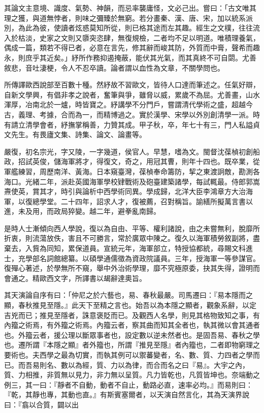 \begin{pinyinscope}
其論文主意境、識度、氣勢、神韻，而忌率襲庸怪，文必己出。嘗曰：「古文唯其理之獲，與道無悖者，則味之彌臻於無窮。若分畫秦、漢、唐、宋，加以統系派別，為此為彼，使讀者炫惑莫知所從，則已格其途而左其趣。經生之文樸，往往流入於枯淡，史家之文則又隳突恣肆，無復規檢，二者均不足以明道。唯積理養氣，偶成一篇，類若不得已者，必意在言先，修其辭而峻其防，外質而中膏，聲希而趣永，則庶乎其近矣。」紓所作務抑遏掩蔽，能伏其光氣，而其真終不可自閟。尤善敘悲，音吐淒梗，令人不忍卒讀。論者謂以血性為文章，不關學問也。

所傳譯歐西說部至百數十種。然紓故不習歐文，皆待人口達而筆述之。任氣好辯，自新文學興，有倡非孝之說者，奮筆與爭，雖脅以威，累歲不為屈。尤善畫，山水渾厚，冶南北於一爐，時皆寶之。紓講學不分門戶，嘗謂清代學術之盛，超越今古，義理、考據，合而為一，而精博過之。實於漢學、宋學以外別創清學一派。時有請立清學會者，紓撫掌稱善，力贊其成。甲子秋，卒，年七十有三，門人私謚貞文先生。有畏廬文集、詩集、論文、論畫等。

嚴復，初名宗光，字又陵，一字幾道，侯官人。早慧，嗜為文。閩督沈葆楨初創船政，招試英俊，儲海軍將才，得復文，奇之，用冠其曹，則年十四也。既卒業，從軍艦練習，周歷南洋、黃海。日本窺臺灣，葆楨奉命籌防，挈之東渡詗敵，勘測各海口。光緒二年，派赴英國海軍學校肄戰術及砲臺建築諸學，每試輒最。侍郎郭嵩燾使英，賞其才，時引與論析中西學術同異。學成歸，北洋大臣李鴻章方大治海軍，以復總學堂。二十四年，詔求人才，復被薦，召對稱旨。諭繕所擬萬言書以進，未及用，而政局猝變。越二年，避拳亂南歸。

是時人士漸傾向西人學說，復以為自由、平等、權利諸說，由之未嘗無利，脫靡所折衷，則流蕩放佚，害且不可勝言，常於廣眾中陳之。復久以海軍積勞敘副將，盡棄去，入貲為同知，累保道員。宣統元年，海軍部立，特授協都統，尋賜文科進士，充學部名詞館總纂。以碩學通儒徵為資政院議員。三年，授海軍一等參謀官。復殫心著述，於學無所不窺，舉中外治術學理，靡不究極原委，抉其失得，證明而會通之。精歐西文字，所譯書以朅辭達奧旨。

其天演論自序有曰：「仲尼之於六藝也，易、春秋最嚴。司馬遷曰：『易本隱而之顯，春秋推見至隱。』此天下至精之言也。始吾以為本隱之顯者，觀象系辭，以定吉兇而已；推見至隱者，誅意褒貶而已。及觀西人名學，則見其格物致知之事，有內籀之術焉，有外籀之術焉。內籀云者，察其曲而知其全者也，執其微以會其通者也。外籀云者，援公理以斷眾事者也，設定數以逆未然者也。是固吾易、春秋之學也。遷所謂『本隱之顯』者外籀也，所謂『推見至隱』者內籀也，二者即物窮理之要術也。夫西學之最為切實，而執其例可以禦蕃變者，名、數、質、力四者之學而已。而吾易則名、數以為經，質、力以為律，而合而名之曰『易』。大宇之內，質、力相推，非質無以見力，非力無以呈質。凡力皆乾也，凡質皆坤也。奈端動之例三，其一曰：『靜者不自動，動者不自止，動路必直，速率必均。』而易則曰：『乾，其靜也專，其動也直。』有斯賓塞爾者，以天演自然言化，其為天演界說曰：『翕以合質，闢以出


\end{pinyinscope}
